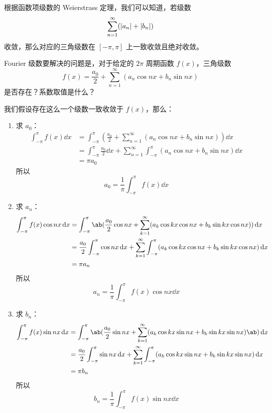 根据函数项级数的 Weierstrass 定理，我们可以知道，若级数
$$
\sum_{n = 1}^{\infty} (\abs{a_n} + \abs{b_n})
$$
收敛，那么对应的三角级数在 $[-\pi, \pi]$ 上一致收敛且绝对收敛。

Fourier 级数要解决的问题是，对于给定的 $2\pi$ 周期函数 $f(x)$，三角级数
$$
f(x) = \frac{a_0}{2} + \sum_{n = 1}^{\infty} (a_n \cos n x + b_n \sin n x)
$$
是否存在？系数取值是什么？

我们假设存在这么一个级数一致收敛于 $f(x)$，那么：

\begin{enumerate}
    \item 求 $a_0$：
    $$
    \begin{aligned}
        \int_{-\pi}^{\pi} f(x) \dd{x} & = \int_{-\pi}^{\pi} \left( \frac{a_0}{2} + \sum_{n = 1}^{\infty} (a_n \cos n x + b_n \sin n x) \right) \dd{x} \\
        & = \int_{-\pi}^{\pi} \frac{a_0}{2} \dd{x} + \sum_{n = 1}^{\infty} \int_{-\pi}^{\pi} (a_n \cos n x + b_n \sin n x) \dd{x} \\
        & = \pi a_0
    \end{aligned}
    $$
    所以
    $$
    a_0 = \frac{1}{\pi} \int_{-\pi}^{\pi} f(x) \dd{x}
    $$
    \item 求 $a_n$：
    $$
    \begin{aligned}
        \int_{-\pi}^{\pi} f(x) \cos n x \dd{x} & = \int_{-\pi}^{\pi} \ab(\frac{a_0}{2} \cos n x + \sum_{k = 1}^{\infty} (a_k \cos k x \cos n x + b_k \sin k x \cos n x)) \dd{x} \\
        & = \frac{a_0}{2} \int_{-\pi}^{\pi} \cos n x \dd{x} + \sum_{k = 1}^{\infty} \int_{-\pi}^{\pi} (a_k \cos k x \cos n x + b_k \sin k x \cos n x) \dd{x} \\
        & = \pi a_n
    \end{aligned}
    $$
    所以
    $$
    a_n = \frac{1}{\pi} \int_{-\pi}^{\pi} f(x) \cos n x \dd{x}
    $$
    \item 求 $b_n$：
    $$
    \begin{aligned}
        \int_{-\pi}^{\pi} f(x) \sin n x \dd{x} & = \int_{-\pi}^{\pi} \ab(\frac{a_0}{2} \sin n x + \sum_{k = 1}^{\infty} (a_k \cos k x \sin n x + b_k \sin k x \sin n x)\ab) \dd{x} \\
        & = \frac{a_0}{2} \int_{-\pi}^{\pi} \sin n x \dd{x} + \sum_{k = 1}^{\infty} \int_{-\pi}^{\pi} (a_k \cos k x \sin n x + b_k \sin k x \sin n x) \dd{x} \\
        & = \pi b_n
    \end{aligned}
    $$
    所以
    $$
    b_n = \frac{1}{\pi} \int_{-\pi}^{\pi} f(x) \sin n x \dd{x}
    $$
\end{enumerate}

